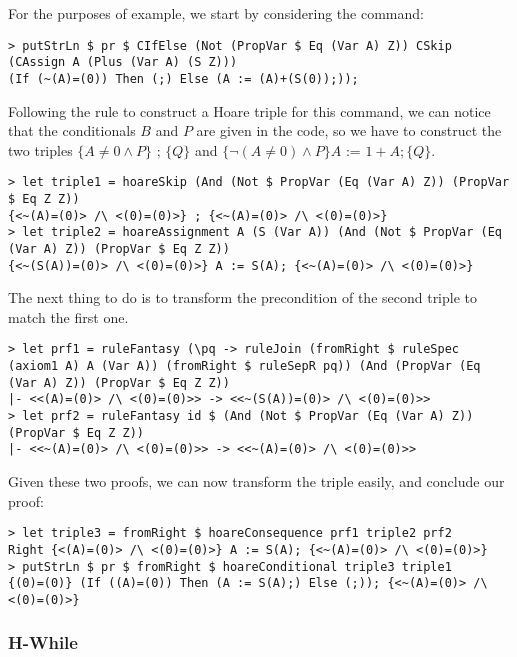 \documentclass{article}
\begin{document}
For the purposes of example, we start by considering the command:

\begin{lstlisting}
> putStrLn $ pr $ CIfElse (Not (PropVar $ Eq (Var A) Z)) CSkip (CAssign A (Plus (Var A) (S Z)))
(If (~(A)=(0)) Then (;) Else (A := (A)+(S(0));));
\end{lstlisting}

Following the rule to construct a Hoare triple for this command, we can notice that the conditionals $B$ and $P$ are given in the code, so we have to construct the two triples $\{A \neq 0 \land P\} \texttt{ ; } \{Q\}$ and $\{\neg(A \neq 0) \land P\} A \texttt{ := } 1 + A; \{Q\}$.

\begin{lstlisting}
> let triple1 = hoareSkip (And (Not $ PropVar (Eq (Var A) Z)) (PropVar $ Eq Z Z))
{<~(A)=(0)> /\ <(0)=(0)>} ; {<~(A)=(0)> /\ <(0)=(0)>}
> let triple2 = hoareAssignment A (S (Var A)) (And (Not $ PropVar (Eq (Var A) Z)) (PropVar $ Eq Z Z))
{<~(S(A))=(0)> /\ <(0)=(0)>} A := S(A); {<~(A)=(0)> /\ <(0)=(0)>}
\end{lstlisting}

The next thing to do is to transform the precondition of the second triple to match the first one.

\begin{lstlisting}
> let prf1 = ruleFantasy (\pq -> ruleJoin (fromRight $ ruleSpec (axiom1 A) A (Var A)) (fromRight $ ruleSepR pq)) (And (PropVar (Eq (Var A) Z)) (PropVar $ Eq Z Z))
|- <<(A)=(0)> /\ <(0)=(0)>> -> <<~(S(A))=(0)> /\ <(0)=(0)>>
> let prf2 = ruleFantasy id $ (And (Not $ PropVar (Eq (Var A) Z)) (PropVar $ Eq Z Z))
|- <<~(A)=(0)> /\ <(0)=(0)>> -> <<~(A)=(0)> /\ <(0)=(0)>>
\end{lstlisting}

Given these two proofs, we can now transform the triple easily, and conclude our proof:

\begin{lstlisting}
> let triple3 = fromRight $ hoareConsequence prf1 triple2 prf2
Right {<(A)=(0)> /\ <(0)=(0)>} A := S(A); {<~(A)=(0)> /\ <(0)=(0)>}
> putStrLn $ pr $ fromRight $ hoareConditional triple3 triple1
{(0)=(0)} (If ((A)=(0)) Then (A := S(A);) Else (;)); {<~(A)=(0)> /\ <(0)=(0)>}
\end{lstlisting}

\subsubsection{H-While}
\end{document}

